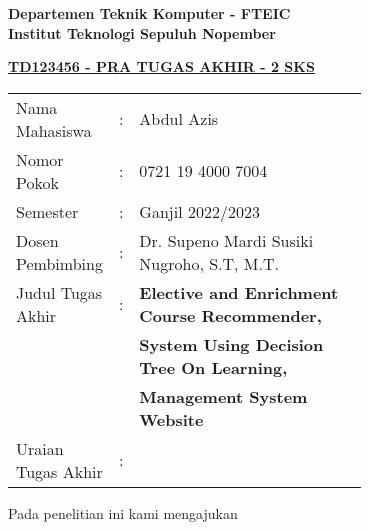\begin{flushleft}
  \textbf{Departemen Teknik Komputer - FTEIC}\\
  \textbf{Institut Teknologi Sepuluh Nopember}\\
\end{flushleft}

\begin{center}
  \underline{\textbf{TD123456 - PRA TUGAS AKHIR - 2 SKS}}
\end{center}

\begin{adjustwidth}{-0.2cm}{}
  \begin{tabular}{lcp{0.7\linewidth}}

    Nama Mahasiswa     & : & Abdul Azis                                            \\
    Nomor Pokok        & : & 0721 19 4000 7004                                     \\

    Semester           & : & Ganjil 2022/2023                                      \\

    Dosen Pembimbing   & : & Dr. Supeno Mardi Susiki Nugroho, S.T, M.T.            \\

    Judul Tugas Akhir  & : & \textbf{Elective and Enrichment Course Recommender, } \\
                       &   & \textbf{System Using Decision Tree On Learning,}      \\
                       &   & \textbf{Management System Website}                    \\

    Uraian Tugas Akhir & : &                                                       \\
  \end{tabular}
\end{adjustwidth}

Pada penelitian ini kami mengajukan \lipsum[1][1-10]
\vspace{1ex}

